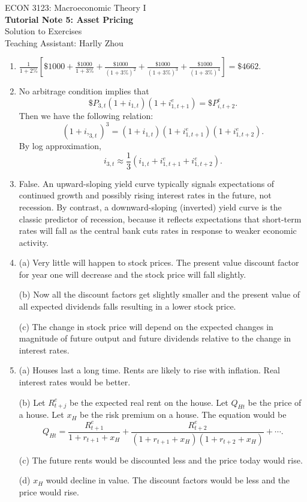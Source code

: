 \documentclass[12pt]{article}
\begin{document}
\begin{center}
    ECON 3123: Macroeconomic Theory I\\
    {\large \textbf{Tutorial Note 5: Asset Pricing}}\\
    Solution to Exercises\\
    Teaching Assistant: Harlly Zhou
\end{center}

\begin{enumerate}[label=\arabic*.]
    \item $\frac{1}{1+2\%}\left[\$1000 + \frac{\$1000}{1+3\%} + \frac{\$1000}{(1+3\%)^2} + \frac{\$1000}{(1+3\%)^3} + \frac{\$1000}{(1+3\%)^4}\right] = \$4662$.
    \item No arbitrage condition implies that
    \[\$P_{3,t} (1+i_{1,t}) (1+i^e_{1,t+1})=\$P^e_{i,t+2}. \]
    Then we have the following relation:
    \[(1+i,_{3,t})^3 = (1+i_{1,t}) (1+i^e_{1,t+1}) (1+i^e_{1,t+2}).\]
    By log approximation,
    \[i_{3,t} \approx \frac{1}{3} (i_{1,t}+i^e_{1,t+1}+i^e_{1,t+2}).\]

    \item False. An upward-sloping yield curve typically signals expectations of continued growth and possibly rising interest rates in the future, not recession. By contrast, a downward-sloping (inverted) yield curve is the classic predictor of recession, because it reflects expectations that short-term rates will fall as the central bank cuts rates in response to weaker economic activity.

    \item (a) Very little will happen to stock prices. The present value discount factor for year one will decrease and the stock price will fall slightly.
    
    (b) Now all the discount factors get slightly smaller and the present value of all expected dividends falls resulting in a lower stock price.
    
    (c) The change in stock price will depend on the expected changes in magnitude of future output and future dividends relative to the change in interest rates.

    \item (a) Houses last a long time. Rents are likely to rise with inflation. Real interest rates would be better.
    
    (b) Let $R^e_{t+j}$ be the expected real rent on the house. Let $Q_{Ht}$ be the price of a house. Let $x_H$ be the risk premium on a house. The equation would be
    \[Q_{Ht} = \frac{R^e_{t+1}}{1 + r_{t+1} + x_H} + \frac{R^e_{t+2}}{(1 + r_{t+1} + x_H)(1 + r_{t+2} + x_H)} + \cdots.\]

    (c) The future rents would be discounted less and the price today would rise.

    (d) $x_H$ would decline in value. The discount factors would be less and the price would rise.
    
\end{enumerate}
\end{document}
